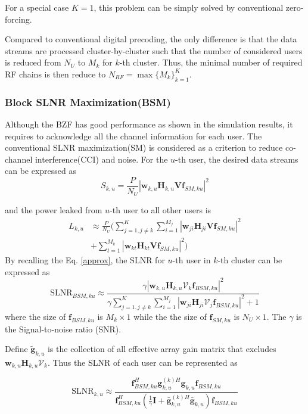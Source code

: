 \documentclass[conference]{IEEEtran}
\begin{document}
{For a special case $K=1$, this problem can be simply solved by conventional zero-forcing.

Compared to conventional digital precoding, the only difference is that the data streams are processed cluster-by-cluster such that the number of considered users is reduced from $N_U$ to $M_k$ for $k$-th cluster. Thus, the minimal number of required RF chains is then reduce to $N_{RF} = \max \{M_k\}_{k=1}^K$.

\subsubsection{Block SLNR Maximization(BSM)}
Although the BZF has good performance as shown in the simulation results, it requires to acknowledge all the channel information for each user.
The conventional SLNR maximization(SM) is considered as a criterion to reduce co-channel interference(CCI) and noise.  For the $u$-th user, the desired data streams can be expressed as
\begin{equation}
S_{k,u} = \frac{P}{N_U}|\bm{w}_{k,u} \bm{H}_{k,u} \bm{V} \bm{f}_{SM,ku}|^2
\end{equation}

and the power leaked from $u$-th user to all other users is
\begin{align}
L_{k,u} &\approx \frac{P}{N_U}(\sum_{j=1,j\neq k}^{K}\sum_{i=1}^{M_j}|\bm{w}_{ji} \bm{H}_{ji} \bm{V} \bm{f}_{SM,ku}|^2\nonumber\\
&+ \sum_{t=1}^{M_k}|\bm{w}_{kt} \bm{H}_{kt} \bm{V}\bm{f}_{SM,ku}|^2)
\end{align}
By recalling the Eq. \eqref{approx}, the SLNR for $u$-th user in $k$-th cluster can be expressed as
\begin{equation}
\text{SLNR}_{BSM, ku} \approx \frac{\gamma|\bm{w}_{k,u} \bm{H}_{k,u} \bm{\mathcal{V}}_k \bm{f}_{BSM,ku}|^2}{\gamma \sum_{j=1,j\neq k}^{K}\sum_{i=1}^{M_j}|\bm{w}_{ji} \bm{H}_{ji} \bm{\mathcal{V}}_j \bm{f}_{BSM,ku}|^2+1}
\end{equation}
where the size of $\bm{f}_{BSM,ku} $ is $M_k\times 1$ while the the size of $\bm{f}_{SM,ku}$ is $N_U \times 1$. The $\gamma$ is the Signal-to-noise ratio (SNR).

Define $\tilde{\bm{g}}_{k,u}$ is the collection of all effective array gain matrix that excludes $\bm{w}_{k,u} \bm{H}_{k,u} \bm{\mathcal{V}}_k$. Thus the SLNR of each user can be represented as

\begin{equation}
\text{SLNR}_{k,u} \approx \frac{\bm{f}_{BSM, ku}^H{\bm{g}}_{k,u}^{(k)H}{\bm{g}}_{k,u} \bm{f}_{BSM, ku}}{\bm{f}_{BSM, ku}^H(\frac{1}{\gamma}\bm{I}+\bar{\bm{g}}_{k,u}^{(k)H}\bar{\bm{g}}_{k,u})\bm{f}_{BSM, ku}}
\end{equation}

}
\end{document}
